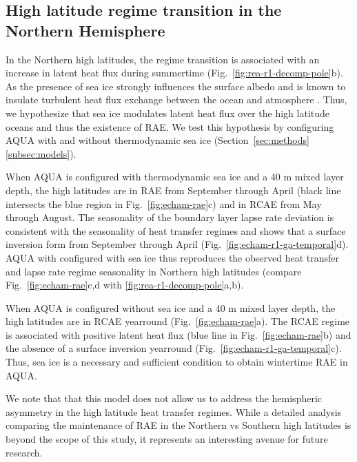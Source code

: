 \documentclass{ametsocV5}
\begin{document}
  \subsection{High latitude regime transition in the Northern Hemisphere} \label{subsec:ice}
  In the Northern high latitudes, the regime transition is associated with an increase in latent heat flux during summertime (Fig.~\ref{fig:rea-r1-decomp-pole}b). As the presence of sea ice strongly influences the surface albedo and is known to insulate turbulent heat flux exchange between the ocean and atmosphere \citep{andreas1979, maykut1982}. Thus, we hypothesize that sea ice modulates latent heat flux over the high latitude oceans and thus the existence of RAE. We test this hypothesis by configuring AQUA with and without thermodynamic sea ice (Section~\ref{sec:methods}\ref{subsec:models}). 


  When AQUA is configured with thermodynamic sea ice and a 40 m mixed layer depth, the high latitudes are in RAE from September through April (black line intersects the blue region in Fig.~\ref{fig:echam-rae}c) and in RCAE from May through August. The seasonality of the boundary layer lapse rate deviation is consistent with the seasonality of heat transfer regimes and shows that a surface inversion form from September through April (Fig.~\ref{fig:echam-r1-ga-temporal}d). AQUA with configured with sea ice thus reproduces the observed heat transfer and lapse rate regime seasonality in Northern high latitudes (compare Fig.~\ref{fig:echam-rae}c,d with \ref{fig:rea-r1-decomp-pole}a,b).
  
  When AQUA is configured without sea ice and a 40 m mixed layer depth, the high latitudes are in RCAE yearround (Fig.~\ref{fig:echam-rae}a). The RCAE regime is associated with positive latent heat flux (blue line in Fig.~\ref{fig:echam-rae}b) and the absence of a surface inversion yearround (Fig.~\ref{fig:echam-r1-ga-temporal}c). Thus, sea ice is a necessary and sufficient condition to obtain wintertime RAE in AQUA.

  We note that that this model does not allow us to address the hemispheric asymmetry in the high latitude heat transfer regimes. While a detailed analysis comparing the maintenance of RAE in the Northern vs Southern high latitudes is beyond the scope of this study, it represents an interesting avenue for future research.
\end{document}
